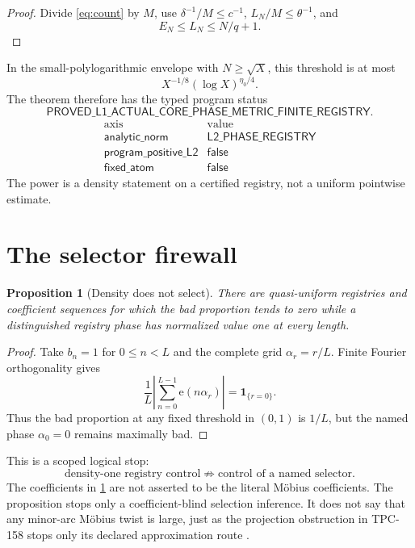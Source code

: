 \documentclass[11pt]{article}
\newtheorem{proposition}[theorem]{Proposition}
\theoremstyle{definition}
\newcommand{\e}{\mathrm e}
\begin{document}
\begin{proof}
Divide \eqref{eq:count} by \(M\), use
\(\delta^{-1}/M\le c^{-1}\),
\(L_N/M\le\theta^{-1}\), and
\[
 E_N\le L_N\le N/q+1.
\]
\end{proof}

In the small-polylogarithmic envelope with \(N\ge\sqrt X\), this
threshold is at most
\[
 X^{-1/8}(\log X)^{\eta_0/4}.
\]
The theorem therefore has the typed program status
\[
 \mathsf{PROVED\_L1\_ACTUAL\_CORE\_
 PHASE\_METRIC\_FINITE\_REGISTRY}.
\]
\[
\begin{array}{c|c}
\text{axis}&\text{value}\\ \hline
\mathsf{analytic\_norm}&\mathsf{L2\_PHASE\_REGISTRY}\\
\mathsf{program\_positive\_L2}&\mathsf{false}\\
\mathsf{fixed\_atom}&\mathsf{false}
\end{array}
\]
The power is a density statement on a certified registry, not a
uniform pointwise estimate.

\section{The selector firewall}

\begin{proposition}[Density does not select]\label{prop:selector}
There are quasi-uniform registries and coefficient sequences for
which the bad proportion tends to zero while a distinguished
registry phase has normalized value one at every length.
\end{proposition}

\begin{proof}
Take \(b_n=1\) for \(0\le n<L\) and the complete grid
\(\alpha_r=r/L\).  Finite Fourier orthogonality gives
\[
 \frac1L\left|\sum_{n=0}^{L-1}\e(n\alpha_r)\right|
 =\mathbf1_{\{r=0\}}.
\]
Thus the bad proportion at any fixed threshold in \((0,1)\) is
\(1/L\), but the named phase \(\alpha_0=0\) remains maximally bad.
\end{proof}

This is a scoped logical stop:
\[
 \text{density-one registry control}
 \not\Rightarrow
 \text{control of a named selector}.
\]
The coefficients in \cref{prop:selector} are not asserted to be the
literal M\"obius coefficients.  The proposition stops only a
coefficient-blind selection inference.  It does not say that any
minor-arc M\"obius twist is large, just as the projection obstruction
in TPC-158 stops only its declared approximation route
\citep{WangTPC158}.
\end{document}

